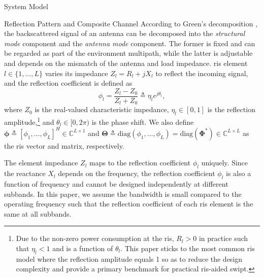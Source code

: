 \begin{section}{System Model}
	\begin{subsection}{Reflection Pattern and Composite Channel}
		According to Green's decomposition \cite{Hansen1989}, the backscattered signal of an antenna can be decomposed into the \emph{structural mode} component and the \emph{antenna mode} component. The former is fixed and can be regarded as part of the environment multipath, while the latter is adjustable and depends on the mismatch of the antenna and load impedance. \gls{ris} element $l \in \{1, \dots, L\}$ varies its impedance $Z_l = R_l + j X_l$ to reflect the incoming signal, and the reflection coefficient is defined as
		\begin{equation}
			\phi_l = \frac{Z_l - Z_0}{Z_l + Z_0} \triangleq \eta_l e^{j\theta_l},
		\end{equation}
		where $Z_0$ is the real-valued characteristic impedance, $\eta_l \in [0, 1]$ is the reflection amplitude,\footnote{Due to the non-zero power consumption at the \gls{ris}, $R_l > 0$ in practice such that $\eta_l < 1$ and is a function of $\theta_l$. This paper sticks to the most common \gls{ris} model where the reflection amplitude equals \num{1} so as to reduce the design complexity and provide a primary benchmark for practical \gls{ris}-aided \gls{swipt}.} and $\theta_l \in [0,2\pi)$ is the phase shift. We also define $\boldsymbol{\phi} \triangleq [\phi_1, \dots, \phi_L]^H \in \mathbb{C}^{L \times 1}$ and $\boldsymbol{\Theta} \triangleq \mathrm{diag}(\phi_1, \dots, \phi_L)=\mathrm{diag}(\boldsymbol{\Phi}^*) \in \mathbb{C}^{L \times L}$ as the \gls{ris} vector and matrix, respectively.

		\begin{remark}\label{re:reflection_coefficient}
			The element impedance $Z_l$ maps to the reflection coefficient $\phi_l$ uniquely. Since the reactance $X_l$ depends on the frequency, the reflection coefficient $\phi_l$ is also a function of frequency and cannot be designed independently at different subbands. In this paper, we assume the bandwidth is small compared to the operating frequency such that the reflection coefficient of each \gls{ris} element is the same at all subbands.
		\end{remark}


\end{subsection}
\end{section}
